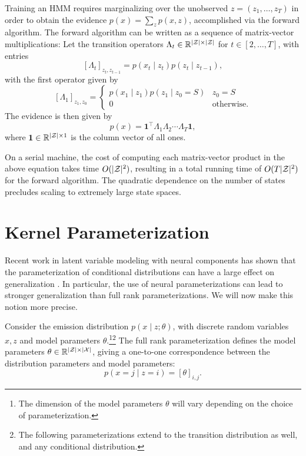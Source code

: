 \documentclass{article}
\begin{document}
Training an HMM requires marginalizing over the unobserved
$z = (z_1,\ldots,z_T)$ in order to obtain the evidence $p(x) = \sum_z p(x,z)$,
accomplished via the forward algorithm.
The forward algorithm can be written as a sequence of matrix-vector multiplications:
Let the transition operators $\Lambda_t\in\mathbb{R}^{|\mathcal{Z}|\times|\mathcal{Z}|}$ for $t\in[2,\ldots,T]$, 
with entries $$[\Lambda_t]_{z_t,z_{t-1}} = p(x_t\mid z_t)p(z_t\mid z_{t-1}),$$
with the first operator given by
$$[\Lambda_1]_{z_1,z_0} = \begin{cases}
p(x_1 \mid z_1) p(z_1 \mid z_0=S) & z_0 = S\\
0 & \textrm{otherwise}.
\end{cases}
$$
The evidence is then given by
\begin{equation}
p(x) = \mathbf{1}^\top\Lambda_1\Lambda_2\cdots\Lambda_T\mathbf{1},
\end{equation}
where $\mathbf{1}\in\mathbb{R}^{|\mathcal{Z}|\times1}$ is the column vector of all ones.

On a serial machine, the cost of computing each matrix-vector product in
the above equation takes time $O(|\mathcal{Z}|^2)$, resulting in a total
running time of $O(T|\mathcal{Z}|^2)$ for the forward algorithm.
The quadratic dependence on the number of states precludes
scaling to extremely large state spaces.

\section{Kernel Parameterization}
Recent work in latent variable modeling with neural components has shown
that the parameterization of conditional distributions can have a large
effect on generalization \citep{kim2019cpcfg}. 
In particular, the use of neural parameterizations can lead to stronger
generalization than full rank parameterizations.
We will now make this notion more precise.

Consider the emission distribution $p(x \mid z; \theta)$,
with discrete random variables $x,z$ and model parameters $\theta$.\footnote{
The dimension of the model parameters $\theta$ will vary depending on the choice
of parameterization.}\footnote{
The following parameterizations extend to the transition distribution as well,
and any conditional distribution.}
The full rank parameterization defines the model parameters $\theta\in\mathbb{R}^{|\mathcal{Z}|\times|\mathcal{X}|}$,
giving a one-to-one correspondence between the distribution parameters and model parameters:
$$p(x=j \mid z=i) = [\theta]_{i,j}.$$
\end{document}
